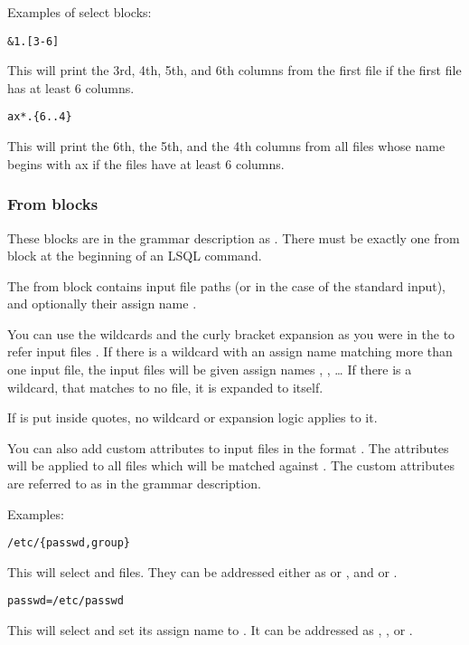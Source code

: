 Examples of select blocks:
\begin{verbatim}
&1.[3-6]
\end{verbatim}
This will print the 3rd, 4th, 5th, and 6th columns from the first file if the first file has at least 6 columns.

\begin{verbatim}
ax*.{6..4}
\end{verbatim}
This will print the 6th, the 5th, and the 4th columns from all files whose name begins with ax if the files have at least 6 columns.

\subsubsection{From blocks}
These blocks are in the grammar description as .
There must be exactly one from block at the beginning of an LSQL command. 

The from block contains input file paths (or \icode{-} in the case of the standard input), and optionally their assign name . 

You can use the wildcards and the curly bracket expansion as you were in the  to refer input files \cite{bash-reference-manual}. 
If there is a wildcard with an assign name  matching more than one input file, the input files will be given assign names , , \ldots{}
If there is a wildcard, that matches to no file, it is expanded to itself.

If  is put inside  quotes, no wildcard or expansion logic applies to it.

You can also add custom attributes to input files in the format . The attributes will be applied to all files which will be matched against .
The custom attributes are referred to as  in the grammar description.

Examples:
\begin{verbatim}
/etc/{passwd,group}
\end{verbatim}

This will select  and  files. They can be addressed either as  or , and  or .

\begin{verbatim}
passwd=/etc/passwd
\end{verbatim}
This will select  and set its assign name to . It can be addressed as , , or .


